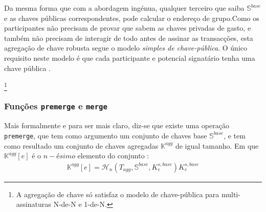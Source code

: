 
Da mesma forma que com a abordagem ingénua, qualquer terceiro que saiba $\mathbb{S}^{base}$ e as chaves públicas correspondentes, pode calcular o endereço de grupo.\newline Como os participantes não precisam de provar que sabem as chaves privadas de gasto, e também não precisam de interagir de todo antes de assinar as transacções, esta agregação de chave robusta segue o modelo {\em simples de chave-pública}. O único requisito neste modelo é que cada participante e potencial signatário tenha uma chave pública \cite{maxwell2018simple-musig}.

\footnote{A agregação de chave só satisfaz o modelo de chave-pública para multi-assinaturas N-de-N e 1-de-N.}

\subsubsection*{Funções {\tt premerge} e {\tt merge}}

Mais formalmente e para ser mais claro, diz-se que existe uma operação {\tt premerge}, que tem como argumento um conjunto de chaves base $\mathbb{S}^{base}$, e tem como resultado um conjunto de chaves agregadas $\mathbb{K}^{agg}$ de igual tamanho. Em que $\mathbb{K}^{agg}[e]$ é o $n-ésimo$ elemento do conjunto :
\begin{align*}
\mathbb{K}^{agg}[e] = \mathcal{H}_n(T_{agg},\mathbb{S}^{base},K^{s,base}_e)K^{s,base}_e
\end{align*}


